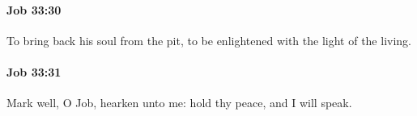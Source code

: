 		\paragraph{Job 33:30} %
			\label{JOB-33-30}

			To bring back his soul from the pit, to be enlightened with the light of the living.


		\paragraph{Job 33:31} %
			\label{JOB-33-31}

			Mark well, O Job, hearken unto me: hold thy peace, and I will speak.


